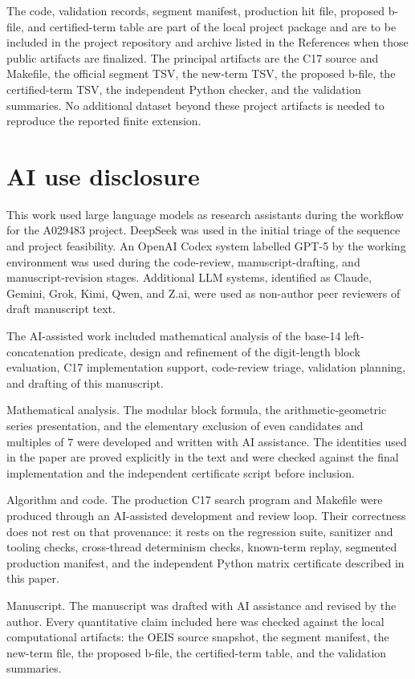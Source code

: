 \documentclass[11pt]{article}
\theoremstyle{definition}
\theoremstyle{remark}
\begin{document}
The code, validation records, segment manifest, production hit file, proposed
b-file, and certified-term table are part of the local project package and are
to be included in the project repository and archive listed in the References
when those public artifacts are finalized.  The principal artifacts are the C17
source and Makefile, the official segment TSV, the new-term TSV, the proposed
b-file, the certified-term TSV, the independent Python checker, and the
validation summaries.  No additional dataset beyond these project artifacts is
needed to reproduce the reported finite extension.

\section*{AI use disclosure}

This work used large language models as research assistants during the
workflow for the A029483 project.  DeepSeek was used in the initial triage of
the sequence and project feasibility.  An OpenAI Codex system labelled GPT-5
by the working environment was used during the code-review,
manuscript-drafting, and manuscript-revision stages.  Additional LLM systems,
identified as Claude, Gemini, Grok, Kimi, Qwen, and Z.ai, were used as
non-author peer reviewers of draft manuscript text.

The AI-assisted work included mathematical analysis of the base-14
left-concatenation predicate, design and refinement of the digit-length block
evaluation, C17 implementation support, code-review triage, validation
planning, and drafting of this manuscript.

Mathematical analysis.  The modular block formula, the arithmetic-geometric
series presentation, and the elementary exclusion of even candidates and
multiples of \(7\) were developed and written with AI assistance.  The
identities used in the paper are proved explicitly in the text and were
checked against the final implementation and the independent certificate
script before inclusion.

Algorithm and code.  The production C17 search program and Makefile were
produced through an AI-assisted development and review loop.  Their correctness
does not rest on that provenance: it rests on the regression suite, sanitizer
and tooling checks, cross-thread determinism checks, known-term replay,
segmented production manifest, and the independent Python matrix certificate
described in this paper.

Manuscript.  The manuscript was drafted with AI assistance and revised by the
author.  Every quantitative claim included here was checked against the local
computational artifacts: the OEIS source snapshot, the segment manifest, the
new-term file, the proposed b-file, the certified-term table, and the
validation summaries.
\end{document}
